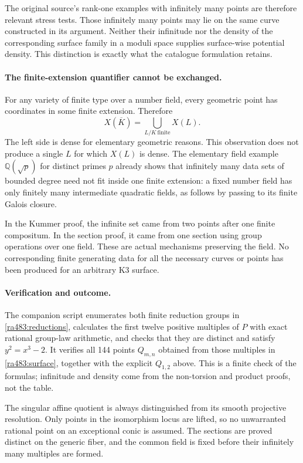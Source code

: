 \documentclass[11pt]{article}
\begin{document}
The original source's rank-one examples with infinitely many points are
therefore relevant stress tests. Those infinitely many points may lie on
the same curve constructed in its argument. Neither their infinitude nor
the density of the corresponding surface family in a moduli space supplies
surface-wise potential density. This distinction is exactly what the
catalogue formulation retains.

\paragraph{The finite-extension quantifier cannot be exchanged.}
For any variety of finite type over a number field, every geometric point
has coordinates in some finite extension. Therefore
\[
 X(\overline K)=\bigcup_{L/K\ \mathrm{finite}}X(L).
\]
The left side is dense for elementary geometric reasons. This observation
does not produce a single $L$ for which $X(L)$ is dense. The elementary
field example $\mathbb Q(\sqrt p)$ for distinct primes $p$ already shows
that infinitely many data sets of bounded degree need not fit inside one
finite extension: a fixed number field has only finitely many intermediate
quadratic fields, as follows by passing to its finite Galois closure.

In the Kummer proof, the infinite set came from two points after one
finite compositum. In the section proof, it came from one section using
group operations over one field. These are actual mechanisms preserving
the field. No corresponding finite generating data for all the necessary
curves or points has been produced for an arbitrary K3 surface.

\paragraph{Verification and outcome.}
The companion script enumerates both finite reduction groups in
\eqref{ra483:reductions}, calculates the first twelve positive multiples
of $P$ with exact rational group-law arithmetic, and checks that they are
distinct and satisfy $y^2=x^3-2$. It verifies all 144 points $Q_{m,n}$
obtained from those multiples in \eqref{ra483:surface}, together with the
explicit $Q_{1,2}$ above. This is a finite check of the formulas; infinitude
and density come from the non-torsion and product proofs, not the table.

The singular affine quotient is always distinguished from its smooth
projective resolution. Only points in the isomorphism locus are lifted,
so no unwarranted rational point on an exceptional conic is assumed.
The sections are proved distinct on the generic fiber, and the common
field is fixed before their infinitely many multiples are formed.
\end{document}

